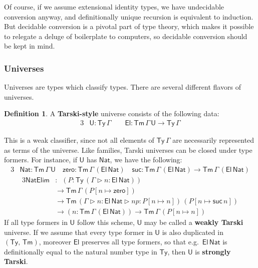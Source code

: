 \documentclass[12pt,a4paper,twoside,openany]{book}
\theoremstyle{remark}
\theoremstyle{definition}
\newtheorem{mydefinition}{Definition}
\theoremstyle{theorem}
\newcommand{\mi}[1]{\mathit{#1}}
\newcommand{\ms}[1]{\mathsf{#1}}
\newcommand{\zero}{\ms{zero}}
\newcommand{\suc}{\ms{suc}}
\newcommand{\Tm}{\mathsf{Tm}}
\newcommand{\Ty}{\mathsf{Ty}}
\newcommand{\U}{\mathsf{U}}
\newcommand{\El}{\mathsf{El}}
\newcommand{\ext}{\triangleright}
\newcommand{\Nat}{\ms{Nat}}
\begin{document}
Of course, if we assume extensional identity types, we have undecidable
conversion anyway, and definitionally unique recursion is equivalent to
induction. But decidable conversion is a pivotal part of type theory, which
makes it possible to relegate a deluge of boilerplate to computers, so
decidable conversion should be kept in mind.

\subsubsection{Universes}

Universes are types which classify types. There are several different flavors of
universes.

\begin{mydefinition} A \textbf{Tarski-style} universe consists of
the following data:
\begin{alignat*}{3}
  & \U : \Ty\,\Gamma\hspace{2em}\El : \Tm\,\Gamma\,\U \to \Ty\,\Gamma
\end{alignat*}
\end{mydefinition}
This is a weak classifier, since not all elements of $\Ty\,\Gamma$ are
necessarily represented as terms of the universe. Like families, Tarski
universes can be closed under type formers. For instance, if $\U$ has $\Nat$, we
have the following:
\begin{alignat*}{3}
  &\Nat : \Tm\,\Gamma\,\U
    \hspace{1em}\zero : \Tm\,\Gamma\,(\El\,\Nat)
    \hspace{1em}\suc : \Tm\,\Gamma\,(\El\,\Nat) \to \Tm\,\Gamma\,(\El\,\Nat)
\end{alignat*}
\vspace{-2em}
\begin{alignat*}{3}
  \ms{NatElim} &:\,\,\,(P : \Ty\,(\Gamma\ext n : \El\,\Nat))\\
  &\to \Tm\,\Gamma\,(P[n \mapsto \zero])\\
  &\to \Tm\,(\Gamma\ext n : \El\,\Nat \ext \mi{np} : P[n \mapsto n])\,(P[n \mapsto \suc\,n]) \\
  &\to (n : \Tm\,\Gamma\,(\El\,\Nat)) \to \Tm\,\Gamma\,(P[n \mapsto n])
\end{alignat*}
If all type formers in $\U$ follow this scheme, $\U$ may be called a
\textbf{weakly Tarski} universe. If we assume that every type former in $\U$ is
also duplicated in $(\Ty,\,\Tm)$, moreover $\El$ preserves all type formers, so
that e.g.\ $\El\,\Nat$ is definitionally equal to the natural number type in
$\Ty$, then $\U$ is \textbf{strongly Tarski}.
\end{document}
